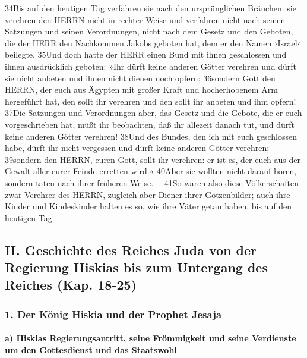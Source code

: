 34Bis auf den heutigen Tag verfahren sie nach den ursprünglichen
Bräuchen: sie verehren den HERRN nicht in rechter Weise und verfahren
nicht nach seinen Satzungen und seinen Verordnungen, nicht nach dem
Gesetz und den Geboten, die der HERR den Nachkommen Jakobs geboten hat,
dem er den Namen ›Israel‹ beilegte. 35Und doch hatte der HERR einen Bund
mit ihnen geschlossen und ihnen ausdrücklich geboten: »Ihr dürft keine
anderen Götter verehren und dürft sie nicht anbeten und ihnen nicht
dienen noch opfern; 36sondern Gott den HERRN, der euch aus Ägypten mit
großer Kraft und hocherhobenem Arm hergeführt hat, den sollt ihr
verehren und den sollt ihr anbeten und ihm opfern! 37Die Satzungen und
Verordnungen aber, das Gesetz und die Gebote, die er euch vorgeschrieben
hat, müßt ihr beobachten, daß ihr allezeit danach tut, und dürft keine
anderen Götter verehren! 38Und des Bundes, den ich mit euch geschlossen
habe, dürft ihr nicht vergessen und dürft keine anderen Götter verehren;
39sondern den HERRN, euren Gott, sollt ihr verehren: er ist es, der euch
aus der Gewalt aller eurer Feinde erretten wird.« 40Aber sie wollten
nicht darauf hören, sondern taten nach ihrer früheren Weise.~-- 41So
waren also diese Völkerschaften zwar Verehrer des HERRN, zugleich aber
Diener ihrer Götzenbilder; auch ihre Kinder und Kindeskinder halten es
so, wie ihre Väter getan haben, bis auf den heutigen Tag.

\hypertarget{ii.-geschichte-des-reiches-juda-von-der-regierung-hiskias-bis-zum-untergang-des-reiches-kap.-18-25}{%
\subsection{II. Geschichte des Reiches Juda von der Regierung Hiskias
bis zum Untergang des Reiches (Kap.
18-25)}\label{ii.-geschichte-des-reiches-juda-von-der-regierung-hiskias-bis-zum-untergang-des-reiches-kap.-18-25}}

\hypertarget{der-kuxf6nig-hiskia-und-der-prophet-jesaja}{%
\subsubsection{1. Der König Hiskia und der Prophet
Jesaja}\label{der-kuxf6nig-hiskia-und-der-prophet-jesaja}}

\hypertarget{a-hiskias-regierungsantritt-seine-fruxf6mmigkeit-und-seine-verdienste-um-den-gottesdienst-und-das-staatswohl}{%
\paragraph{a) Hiskias Regierungsantritt, seine Frömmigkeit und seine
Verdienste um den Gottesdienst und das
Staatswohl}\label{a-hiskias-regierungsantritt-seine-fruxf6mmigkeit-und-seine-verdienste-um-den-gottesdienst-und-das-staatswohl}}

